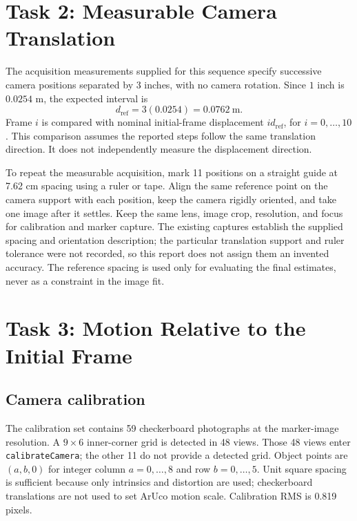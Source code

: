 \documentclass[conference,letterpaper]{IEEEtran}
\newcommand{\code}[1]{\nolinkurl{#1}}
\begin{document}
\section{Task 2: Measurable Camera Translation}
The acquisition measurements supplied for this sequence specify successive camera positions separated by 3 inches, with no camera rotation. Since $1$ inch is $0.0254$ m, the expected interval is
\begin{equation}d_{\mathrm{ref}}=3(0.0254)=0.0762\ \mathrm{m}.
\end{equation}
Frame $i$ is compared with nominal initial-frame displacement $i d_{\mathrm{ref}}$, for $i=0,\ldots,10$. This comparison assumes the reported steps follow the same translation direction. It does not independently measure the displacement direction.

To repeat the measurable acquisition, mark 11 positions on a straight guide at 7.62 cm spacing using a ruler or tape. Align the same reference point on the camera support with each position, keep the camera rigidly oriented, and take one image after it settles. Keep the same lens, image crop, resolution, and focus for calibration and marker capture. The existing captures establish the supplied spacing and orientation description; the particular translation support and ruler tolerance were not recorded, so this report does not assign them an invented accuracy. The reference spacing is used only for evaluating the final estimates, never as a constraint in the image fit.

\section{Task 3: Motion Relative to the Initial Frame}
\subsection{Camera calibration}
The calibration set contains 59 checkerboard photographs at the marker-image resolution. A $9\times6$ inner-corner grid is detected in 48 views. Those 48 views enter \code{calibrateCamera}; the other 11 do not provide a detected grid. Object points are $(a,b,0)$ for integer column $a=0,\ldots,8$ and row $b=0,\ldots,5$. Unit square spacing is sufficient because only intrinsics and distortion are used; checkerboard translations are not used to set ArUco motion scale. Calibration RMS is 0.819 pixels.
\end{document}
